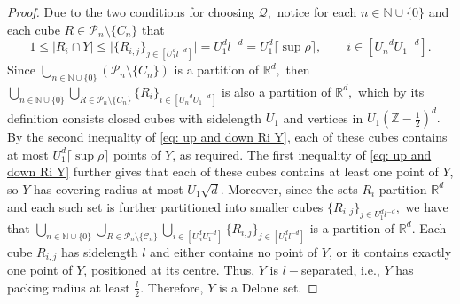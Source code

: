\documentclass{article}
\newcommand{\R}{\mathbb{R}}
\newcommand{\Z}{\mathbb{Z}}
\newcommand{\N}{\mathbb{N}}
\begin{document}
\begin{proof}
    Due to the two conditions for choosing $\mathcal{Q},$ notice for each $n \in \N \cup \{0\}$ and each cube $R \in \mathcal{P}_n \setminus \{C_n\}$ that 
    \begin{equation} \label{eq: up and down Ri Y}
        1 \leq |R_i \cap Y| \leq \bigg|\{R_{i,j}\}_{j \in [U_1^dl^{-d}]}\bigg| = U_1^dl^{-d} =U_1^d\lceil \sup \rho \rceil, \qquad i \in [{U_n}^d{U_1}^{-d}].
    \end{equation} 
   Since $\bigcup_{n \in \N \cup \{0\}} (\mathcal{P}_n\setminus \{C_n\})$ is a partition of $\R^d,$ then $\bigcup_{n \in \N \cup \{0\}}\bigcup_{R \in \mathcal{P}_n\setminus \{C_n\}}\{R_i\}_{i \in [{U_n}^d{U_1}^{-d}]}$ is also a partition of $\R^d,$ which by its definition consists closed cubes with sidelength $U_1$ and vertices in $U_1(\Z-\frac{1}{2})^d.$ By the second inequality of \eqref{eq: up and down Ri Y}, each of these cubes contains at most $U_1^d\lceil \sup\rho\rceil$ points of $Y$, as required.
   The first inequality of \eqref{eq: up and down Ri Y} further gives that each of these cubes contains at least one point of $Y$, so $Y$ has covering radius at most $U_1\sqrt{d}.$
   Moreover, since the sets $R_i$ partition $\R^d$ and each such set is further partitioned into smaller cubes $\{R_{i,j}\}_{j \in U_1^dl^{-d}},$ we have that $\bigcup_{n \in \N \cup \{0\}} \bigcup_{R \in \mathcal{P}_n \setminus \{\mathcal{C}_n\}}\bigcup_{i \in [U_n^dU_1^{-d}]}\{R_{i,j}\}_{j \in [U_1^dl^{-d}]}$ is a partition of $\R^d.$ Each cube $R_{i,j}$ has sidelength $l$ and either contains no point of $Y$, or it contains exactly one point of $Y$, positioned at its centre. Thus, $Y$ is $l-$separated, i.e., $Y$ has packing radius at least $\frac{l}{2}.$ Therefore, $Y$ is a Delone set.


\end{proof}
\end{document}
